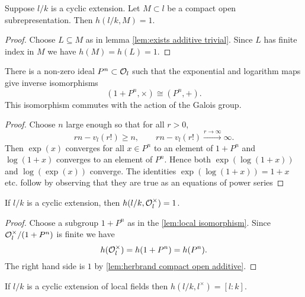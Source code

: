 \begin{lemma} \label{lem:herbrand compact open additive}
	Suppose $l/k$ is a cyclic extension.
	Let $M \subset l$ be a compact open subrepresentation.
	Then $h(l/k,M)=1$.
\end{lemma}

\begin{proof}
	Choose $L \subseteq M$ as in lemma \ref{lem:exists additive trivial}.
	Since $L$ has finite index in $M$ we have $h(M) = h(L) = 1$.
\end{proof}


\begin{lemma}\label{lem:local isomorphism}
	There is a non-zero ideal $P^n \subset {\mathcal O}_l$ such that the
	exponential and logarithm maps give inverse isomorphisms
	\[
		(1 + P^n, \times) \cong (P^n,+).
	\]
	This isomorphism commutes with the action of the Galois group.
\end{lemma}

\begin{proof}
	Choose $n$ large enough so that for all $r > 0$,
	\[
		rn - v_l(r!) \ge n, \qquad
		rn - v_l(r!) \stackrel{r \to \infty}\to \infty.
	\]
	Then $\exp(x)$ converges for all $x \in P^n$ to an element of $1 + P^n$ and
	$\log(1+x)$ converges to an element of $P^n$.
	Hence both $\exp(\log(1+x))$ and $\log(\exp(x))$ converge.
	The identities $\exp(\log(1+x))=1+x$ etc. follow by observing that they are true as
	an equations of power series
\end{proof}


\begin{lemma}\label{lem:herbrand local units}
	If $l/k$ is a cyclic extension, then $h(l/k, {\mathcal O}_l^\times) = 1$.
\end{lemma}

\begin{proof}
	Choose a subgroup $1+P^n$ as in the \ref{lem:local isomorphism}.
	Since ${\mathcal O}_l^\times / (1+P^n)$ is finite we have
	\[
		h({\mathcal O}_l^\times) = h(1+P^n) = h(P^n).
	\]
	The right hand side is $1$ by \ref{lem:herbrand compact open additive}.
\end{proof}

\begin{lemma} \label{lem:herbrand local l*}
	If $l/k$ is a cyclic extension of local fields then $h(l/k, l^\times)= [l:k]$.
\end{lemma}

